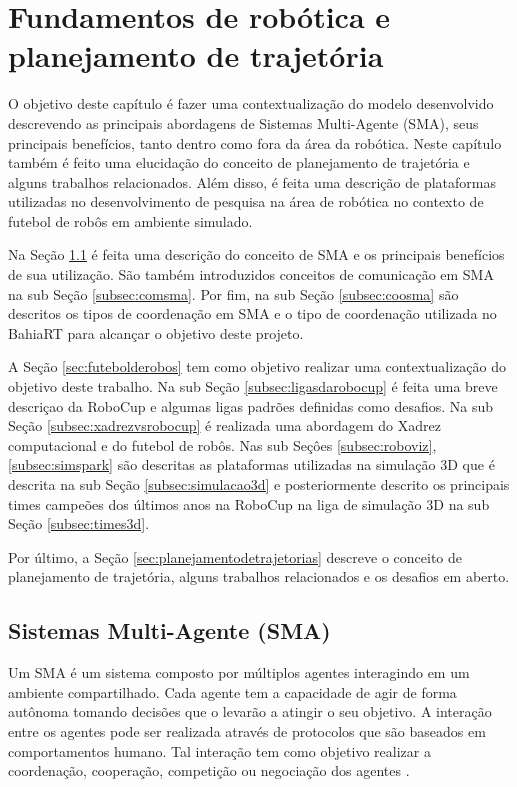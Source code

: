 \chapter{Fundamentos de robótica e planejamento de trajetória}
\label{chap:fundam}
O objetivo deste capítulo é fazer uma contextualização do modelo desenvolvido descrevendo as principais abordagens 
de Sistemas Multi-Agente (SMA), seus principais benefícios, tanto dentro como fora da área da robótica. Neste capítulo também 
é feito uma elucidação do conceito de planejamento de trajetória e alguns trabalhos relacionados. Além disso, 
é feita uma descrição de plataformas utilizadas no desenvolvimento de pesquisa na área de robótica no contexto de futebol 
de robôs em ambiente simulado.

Na Seção \ref{sec:sma} é feita uma descrição do conceito de SMA e os principais benefícios de sua 
utilização. São também introduzidos conceitos de comunicação em SMA na sub Seção \ref{subsec:comsma}. 
Por fim, na sub Seção \ref{subsec:coosma} são descritos os tipos de coordenação em SMA e o tipo de 
coordenação utilizada no BahiaRT para alcançar o objetivo deste projeto.

A Seção \ref{sec:futebolderobos} tem como objetivo realizar uma contextualização do objetivo deste trabalho. Na sub Seção
\ref{subsec:ligasdarobocup} é feita uma breve descriçao da RoboCup e algumas ligas padrões definidas como desafios. Na 
sub Seção \ref{subsec:xadrezvsrobocup} é realizada uma abordagem do Xadrez computacional e do futebol de robôs. Nas sub Seçôes 
\ref{subsec:roboviz}, \ref{subsec:simspark} são descritas as plataformas utilizadas na simulação 3D que é descrita na sub Seção 
\ref{subsec:simulacao3d} e posteriormente descrito os principais times campeões dos últimos anos na RoboCup na liga de simulação 3D 
na sub Seção \ref{subsec:times3d}.

Por último, a Seção \ref{sec:planejamentodetrajetorias} descreve o conceito de planejamento de trajetória, alguns trabalhos 
relacionados e os desafios em aberto.

\section{Sistemas Multi-Agente (SMA)}
\label{sec:sma}
Um SMA é um sistema composto por múltiplos agentes interagindo em um ambiente compartilhado. Cada agente
tem a capacidade de agir de forma autônoma tomando decisões que o levarão a atingir o seu objetivo. A interação entre os agentes 
pode ser realizada através de protocolos que são baseados em comportamentos humano. Tal interação tem como objetivo realizar a 
coordenação, cooperação, competição ou negociação dos agentes \cite{reisTese}.

